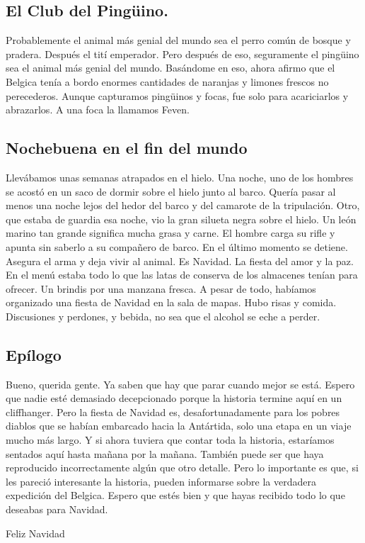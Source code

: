 \documentclass{article}
\begin{document}
    \subsection{El Club del Pingüino.}
    \noindent Probablemente el animal más genial del mundo sea el perro común de bosque y pradera. Después el tití emperador.
    Pero después de eso, seguramente el pingüino sea el animal más genial del mundo. Basándome en eso, ahora afirmo
    que el Belgica tenía a bordo enormes cantidades de naranjas y limones frescos no perecederos. Aunque capturamos
    pingüinos y focas, fue solo para acariciarlos y abrazarlos. A una foca la llamamos Feven.\\
    \subsection{Nochebuena en el fin del mundo}
    \noindent Llevábamos unas semanas atrapados en el hielo. Una noche, uno de los hombres se acostó en un saco de dormir
    sobre
    el hielo junto al barco. Quería pasar al menos una noche lejos del hedor del barco y del camarote de la
    tripulación. Otro, que estaba de guardia esa noche, vio la gran silueta negra sobre el hielo. Un león marino tan
    grande significa mucha grasa y carne. El hombre carga su rifle y apunta sin saberlo a su compañero de barco. En
    el
    último momento se detiene. Asegura el arma y deja vivir al animal. Es Navidad. La fiesta del amor y la paz. En
    el
    menú estaba todo lo que las latas de conserva de los almacenes tenían para ofrecer. Un brindis por una manzana
    fresca. A pesar de todo, habíamos organizado una fiesta de Navidad en la sala de mapas. Hubo risas y comida.
    Discusiones y perdones, y bebida, no sea que el alcohol se eche a perder.\\
    \subsection{Epílogo}       %
    \noindent Bueno, querida gente. Ya saben que hay que parar cuando mejor se está. Espero que nadie esté demasiado
    decepcionado porque la historia termine aquí en un cliffhanger. Pero la fiesta de Navidad es, desafortunadamente
    para los pobres diablos que se habían embarcado hacia la Antártida, solo una etapa en un viaje mucho más largo.
    Y
    si ahora tuviera que contar toda la historia, estaríamos sentados aquí hasta mañana por la mañana. También puede
    ser que haya reproducido incorrectamente algún que otro detalle. Pero lo importante es que, si les pareció
    interesante la historia, pueden informarse sobre la verdadera expedición del Belgica. Espero que estés bien y
    que
    hayas recibido todo lo que deseabas para Navidad.\\
    \begin{center}Feliz Navidad\end{center}
\end{document}
